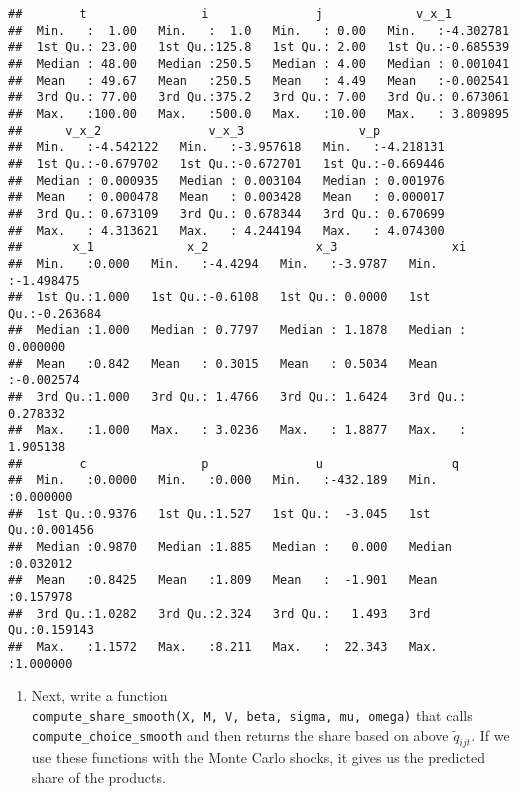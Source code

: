\documentclass[
]{book}
\providecommand{\tightlist}{%
  \setlength{\itemsep}{0pt}\setlength{\parskip}{0pt}}
\begin{document}
\begin{verbatim}
##        t                i               j             v_x_1          
##  Min.   :  1.00   Min.   :  1.0   Min.   : 0.00   Min.   :-4.302781  
##  1st Qu.: 23.00   1st Qu.:125.8   1st Qu.: 2.00   1st Qu.:-0.685539  
##  Median : 48.00   Median :250.5   Median : 4.00   Median : 0.001041  
##  Mean   : 49.67   Mean   :250.5   Mean   : 4.49   Mean   :-0.002541  
##  3rd Qu.: 77.00   3rd Qu.:375.2   3rd Qu.: 7.00   3rd Qu.: 0.673061  
##  Max.   :100.00   Max.   :500.0   Max.   :10.00   Max.   : 3.809895  
##      v_x_2               v_x_3                v_p           
##  Min.   :-4.542122   Min.   :-3.957618   Min.   :-4.218131  
##  1st Qu.:-0.679702   1st Qu.:-0.672701   1st Qu.:-0.669446  
##  Median : 0.000935   Median : 0.003104   Median : 0.001976  
##  Mean   : 0.000478   Mean   : 0.003428   Mean   : 0.000017  
##  3rd Qu.: 0.673109   3rd Qu.: 0.678344   3rd Qu.: 0.670699  
##  Max.   : 4.313621   Max.   : 4.244194   Max.   : 4.074300  
##       x_1             x_2               x_3                xi           
##  Min.   :0.000   Min.   :-4.4294   Min.   :-3.9787   Min.   :-1.498475  
##  1st Qu.:1.000   1st Qu.:-0.6108   1st Qu.: 0.0000   1st Qu.:-0.263684  
##  Median :1.000   Median : 0.7797   Median : 1.1878   Median : 0.000000  
##  Mean   :0.842   Mean   : 0.3015   Mean   : 0.5034   Mean   :-0.002574  
##  3rd Qu.:1.000   3rd Qu.: 1.4766   3rd Qu.: 1.6424   3rd Qu.: 0.278332  
##  Max.   :1.000   Max.   : 3.0236   Max.   : 1.8877   Max.   : 1.905138  
##        c                p               u                  q           
##  Min.   :0.0000   Min.   :0.000   Min.   :-432.189   Min.   :0.000000  
##  1st Qu.:0.9376   1st Qu.:1.527   1st Qu.:  -3.045   1st Qu.:0.001456  
##  Median :0.9870   Median :1.885   Median :   0.000   Median :0.032012  
##  Mean   :0.8425   Mean   :1.809   Mean   :  -1.901   Mean   :0.157978  
##  3rd Qu.:1.0282   3rd Qu.:2.324   3rd Qu.:   1.493   3rd Qu.:0.159143  
##  Max.   :1.1572   Max.   :8.211   Max.   :  22.343   Max.   :1.000000
\end{verbatim}

\begin{enumerate}
\def\labelenumi{\arabic{enumi}.}
\setcounter{enumi}{8}
\tightlist
\item
  Next, write a function \texttt{compute\_share\_smooth(X,\ M,\ V,\ beta,\ sigma,\ mu,\ omega)} that calls \texttt{compute\_choice\_smooth} and then returns the share based on above \(\tilde{q}_{ijt}\). If we use these functions with the Monte Carlo shocks, it gives us the predicted share of the products.
\end{enumerate}
\end{document}
